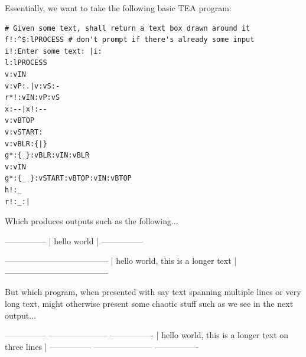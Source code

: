 \documentclass[a4paper, 18pt]{book} %
\begin{document}
{{{\vspace{2em}

Essentially, we want to take the following basic TEA program:

\vspace{2em}
  \begin{tcolorbox}[teaterminalstyle, title=TEA Sample Program: Draw Text Box, breakable]
  \begin{lstlisting}[language=TEA,breaklines=true,]
# Given some text, shall return a text box drawn around it
f!:^$:lPROCESS # don't prompt if there's already some input
i!:Enter some text: |i:
l:lPROCESS
v:vIN
v:vP:.|v:vS:-
r*!:vIN:vP:vS
x:--|x!:--
v:vBTOP
v:vSTART:
v:vBLR:{|}
g*:{ }:vBLR:vIN:vBLR
v:vIN
g*:{_ }:vSTART:vBTOP:vIN:vBTOP
h!:_
r!:_:|
   \end{lstlisting}
  \end{tcolorbox}
\vspace{2em}

Which produces outputs such as the following...


  \vspace{2em}
 \begin{tcbverbatim}[title=Sample OUTPUT 1 from Basic Text-Box Drawing TEA Program]
 ---------------
 | hello world |
 ---------------
  \end{tcbverbatim}
  
  \vspace{2em}
 

 \begin{tcbverbatim}[title=Sample OUTPUT 2 from Basic Text-Box Drawing TEA Program]
 --------------------------------------
 | hello world, this is a longer text |
 --------------------------------------
  \end{tcbverbatim}


  \vspace{2em}
 
 
 But which program, when presented with say text spanning multiple lines or very long text, might otherwise present some chaotic stuff such as we see in the next output...
 
 
   \vspace{2em}
 

 \begin{tcbverbatim}[title=Sample OUTPUT 3 from Basic Text-Box Drawing TEA Program]
  ---------------
---------------------
----------------
 | hello world, 
this is a longer text
on three lines |
 ---------------
---------------------
----------------
  \end{tcbverbatim}
 \vspace{2em}
 

}}}
\end{document}
